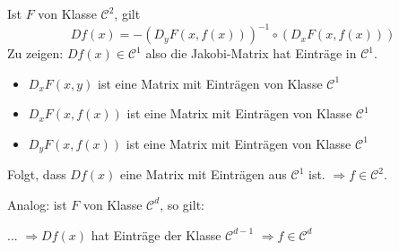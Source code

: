 \documentclass[main.tex]{subfiles}
\begin{document}
\begin{Beweis}
  Ist $F$ von Klasse $\mathcal{C}^2$, gilt
  $$Df(x) = - (D_y F(x,f(x)))^{-1} \circ (D_x F(x,f(x)))$$
  Zu zeigen: $Df(x) \in \mathcal{C}^1$ also die Jakobi-Matrix hat Einträge in $\mathcal{C}^1$.
  \begin{itemize}
    \item $D_x F(x,y)$ ist eine Matrix mit Einträgen von Klasse $\mathcal{C}^1$
    \item $D_x F(x,f(x))$ ist eine Matrix mit Einträgen von Klasse $\mathcal{C}^1$
    \item $D_y F(x,f(x))$ ist eine Matrix mit Einträgen von Klasse $\mathcal{C}^1$
  \end{itemize}
  Folgt, dass $D f(x)$ eine Matrix mit Einträgen aus $\mathcal{C}^1$ ist. $\Rightarrow f \in \mathcal{C}^2$.

  Analog: ist $F$ von Klasse $\mathcal{C}^d$, so gilt:

  ... $\Rightarrow Df(x)$ hat Einträge der Klasse $\mathcal{C}^{d-1}$ $\Rightarrow f \in \mathcal{C}^d$
\end{Beweis}
\end{document}
